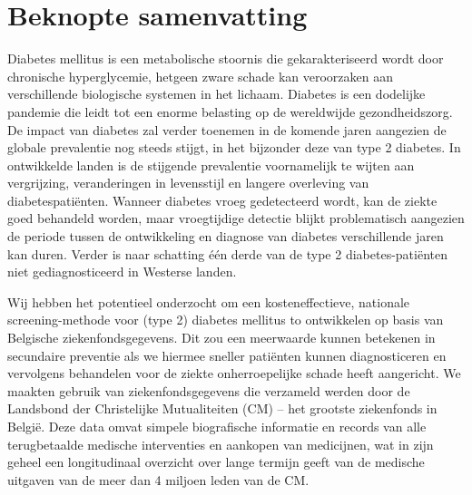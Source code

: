 \chapter*{Beknopte samenvatting}

Diabetes mellitus is een metabolische stoornis die gekarakteriseerd wordt door chronische hyperglycemie, hetgeen zware schade kan veroorzaken aan verschillende biologische systemen in het lichaam. Diabetes is een dodelijke pandemie die leidt tot een enorme belasting op de wereldwijde gezondheidszorg. De impact van diabetes zal verder toenemen in de komende jaren aangezien de globale prevalentie nog steeds stijgt, in het bijzonder deze van type 2 diabetes. In ontwikkelde landen is de stijgende prevalentie voornamelijk te wijten aan vergrijzing, veranderingen in levensstijl en langere overleving van diabetespati\"enten. Wanneer diabetes vroeg gedetecteerd wordt, kan de ziekte goed behandeld worden, maar vroegtijdige detectie blijkt problematisch aangezien de periode tussen de ontwikkeling en diagnose van diabetes verschillende jaren kan duren. Verder is naar schatting \'e\'en derde van de type 2 diabetes-pati\"enten niet gediagnosticeerd in Westerse landen.


Wij hebben het potentieel onderzocht om een kosteneffectieve, nationale screening-methode voor (type 2) diabetes mellitus to ontwikkelen op basis van Belgische ziekenfondsgegevens. Dit zou een meerwaarde kunnen betekenen in secundaire preventie als we hiermee sneller pati\"enten kunnen diagnosticeren en vervolgens behandelen voor de ziekte onherroepelijke schade heeft aangericht. We maakten gebruik van ziekenfondsgegevens die verzameld werden door de Landsbond der Christelijke Mutualiteiten (CM) -- het grootste ziekenfonds in Belgi\"e. Deze data omvat simpele biografische informatie en records van alle terugbetaalde medische interventies en aankopen van medicijnen, wat in zijn geheel een longitudinaal overzicht over lange termijn geeft van de medische uitgaven van de meer dan 4 miljoen leden van de CM.

